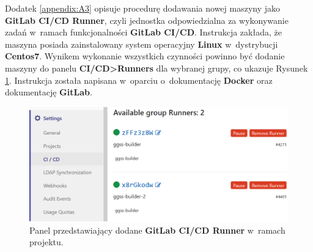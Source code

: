 \onecolumn




\newpage





Dodatek \ref{appendix:A3} opisuje procedurę dodawania nowej maszyny jako \textbf{GitLab CI/CD Runner}, czyli jednostka odpowiedzialna za wykonywanie zadań w~ramach funkcjonalności \textbf{GitLab CI/CD}. Instrukcja zakłada, że maszyna posiada zainstalowany system operacyjny \textbf{Linux} w~dystrybucji \textbf{Centos7}. Wynikem wykonanie wszystkich czynności powinno być dodanie maszyny do panelu \textbf{CI/CD>Runners} dla wybranej grupy, co ukazuje Rysunek \ref{fig:runner}. Instrukcja została napisana w~oparciu o~dokumentację \textbf{Docker}\cite{DockerInstall} oraz dokumentację \textbf{GitLab}\cite{RunnerRegister}.

\begin{figure}
\includegraphics[width=\textwidth]{res/png/runnerAdded}
\caption{Panel przedstawiający dodane \textbf{GitLab CI/CD Runner} w~ramach projektu.}
\label{fig:runner}
\end{figure}
